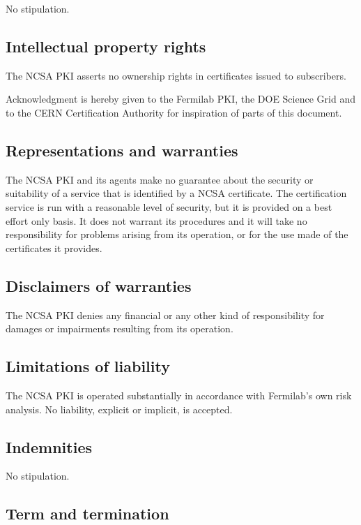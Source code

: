 \documentclass[10pt]{article}
\begin{document}
No stipulation.

\subsection{Intellectual property rights}

The NCSA PKI asserts no ownership rights in certificates issued to
subscribers. 

Acknowledgment is hereby given to the Fermilab PKI, the DOE Science
Grid and to the CERN Certification Authority for inspiration of parts
of this document.

\subsection{Representations and warranties}

The NCSA PKI and its agents make no guarantee about the security or
suitability of a service that is identified by a NCSA certificate. The
certification service is run with a reasonable level of security, but
it is provided on a best effort only basis. It does not warrant its
procedures and it will take no responsibility for problems arising
from its operation, or for the use made of the certificates it
provides.

\subsection{Disclaimers of warranties}

The NCSA PKI denies any financial or any other kind of responsibility
for damages or impairments resulting from its operation.

\subsection{Limitations of liability}

The NCSA PKI is operated substantially in accordance with Fermilab’s
own risk analysis. No liability, explicit or implicit, is accepted.

\subsection{Indemnities}

No stipulation.

\subsection{Term and termination}
\end{document}
